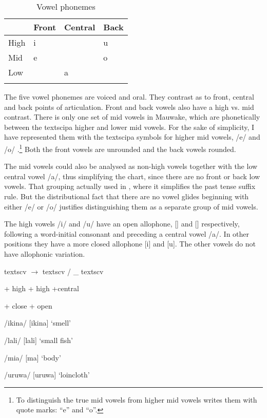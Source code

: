 \begin{table}
\caption{Vowel phonemes}
\label{tab:3:vowelphonemes}
\begin{tabular}{llll}
\mytoprule
& Front & Central & Back\\
\midrule
High & i &  & u\\
Mid & e &  & o\\
Low &  & a & \\
\mybottomrule
\end{tabular}
\end{table}


The five vowel phonemes are voiced and oral. They contrast as to front, central and back points of articulation. Front and back vowels also have a high vs. mid contrast. There is only one set of mid vowels in Mauwake, which are phonetically between the textsc{ipa} higher and lower mid vowels.  For the sake of simplicity, I have represented them with the textsc{ipa} symbols for higher mid vowels, /e/ and /o/ .\footnote{To distinguish the true mid vowels from higher mid vowels \citet[123]{Maddieson1984} writes them with quote marks: ``e'' and ``o''.}  Both the front vowels are unrounded and the back vowels rounded.

The mid vowels could also be analysed as non-high vowels together with the low central vowel /a/, thus simplifying the chart, since there are no front or back low vowels. That grouping  actually used in , where it simplifies the past tense suffix rule. But the distributional fact that there are no vowel glides beginning with either /e/ or /o/ justifies distinguishing them as a separate group of mid vowels.  

The high vowels /i/ and /u/ have an open allophone, [{\textsci}] and [{\textupsilon}] respectively, following a word-initial consonant and preceding a central vowel /a/. In other positions they have a more closed allophone [i] and [u]. The other vowels do not have allophonic variation.

textsc{v}    $\rightarrow $  textsc{v}  /  \_  textsc{v}

+ high  + high      +central

+ close  + open  

/ikina/  [i{{\textprimstress}kina}]  `smell'

/lali/  [la{{\textprimstress}li}]  `small fish'

/mia/  [m{\textsci{{\textprimstress}}}a]  `body'

/uruwa/  [u{{\textprimstress}ruwa}]  `loincloth'

